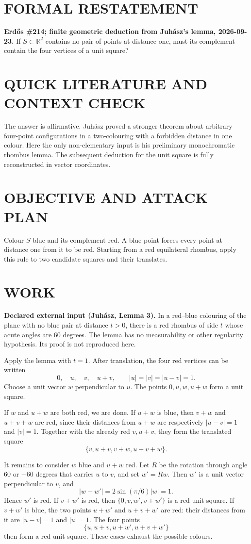 \section{FORMAL RESTATEMENT}
\textbf{Erd\H{o}s \#214; finite geometric deduction from Juh\'asz's lemma, 2026-09-23.}
If $S\subset\mathbb R^2$ contains no pair of points at distance one, must its complement contain the four vertices of a unit square?

\section{QUICK LITERATURE AND CONTEXT CHECK}
The answer is affirmative. Juh\'asz proved a stronger theorem about arbitrary four-point configurations in a two-colouring with a forbidden distance in one colour. Here the only non-elementary input is his preliminary monochromatic rhombus lemma. The subsequent deduction for the unit square is fully reconstructed in vector coordinates.

\section{OBJECTIVE AND ATTACK PLAN}
Colour $S$ blue and its complement red. A blue point forces every point at distance one from it to be red. Starting from a red equilateral rhombus, apply this rule to two candidate squares and their translates.

\section{WORK}
\textbf{Declared external input (Juh\'asz, Lemma 3).} In a red--blue colouring of the plane with no blue pair at distance $t>0$, there is a red rhombus of side $t$ whose acute angles are $60$ degrees. The lemma has no measurability or other regularity hypothesis. Its proof is not reproduced here.

Apply the lemma with $t=1$. After translation, the four red vertices can be written
\[
0,\quad u,\quad v,\quad u+v,
\qquad |u|=|v|=|u-v|=1.
\tag{1}
\]
Choose a unit vector $w$ perpendicular to $u$. The points $0,u,w,u+w$ form a unit square.

If $w$ and $u+w$ are both red, we are done. If $u+w$ is blue, then $v+w$ and $u+v+w$ are red, since their distances from $u+w$ are respectively $|u-v|=1$ and $|v|=1$. Together with the already red $v,u+v$, they form the translated square
\[
\{v,u+v,v+w,u+v+w\}.
\tag{2}
\]

It remains to consider $w$ blue and $u+w$ red. Let $R$ be the rotation through angle $60$ or $-60$ degrees that carries $u$ to $v$, and set $w'=Rw$. Then $w'$ is a unit vector perpendicular to $v$, and
\[
|w-w'|=2\sin(\pi/6)|w|=1.
\]
Hence $w'$ is red. If $v+w'$ is red, then $\{0,v,w',v+w'\}$ is a red unit square. If $v+w'$ is blue, the two points $u+w'$ and $u+v+w'$ are red: their distances from it are $|u-v|=1$ and $|u|=1$. The four points
\[
\{u,u+v,u+w',u+v+w'\}
\tag{3}
\]
then form a red unit square. These cases exhaust the possible colours.

